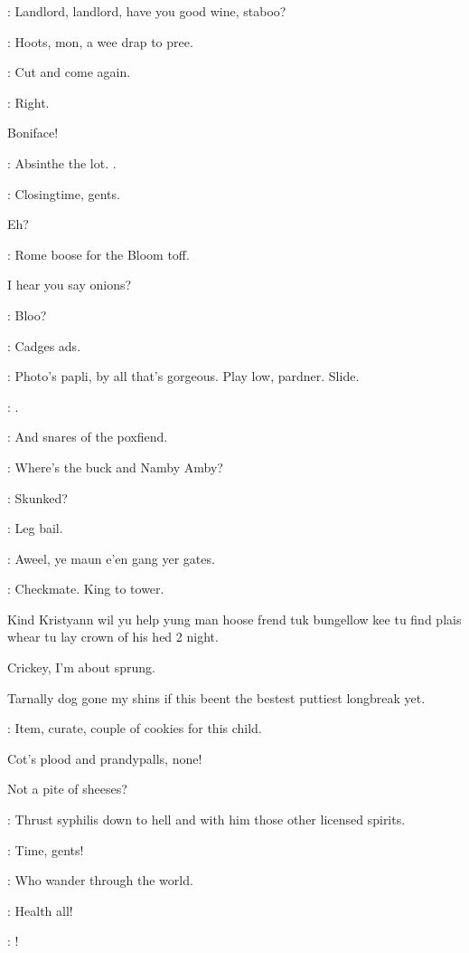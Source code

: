 \punch:
Landlord,
landlord,
have you good wine,
staboo?

\crotthers:
Hoots,
mon,
a wee drap to pree.

\lenehan:
Cut and come again.

\barman:
Right.

Boniface!

\stephen:
Absinthe the lot.
.

\barman:
Closingtime,
gents.

Eh?

\stephen:
Rome boose for the Bloom toff.

I hear you say onions?

\bannon:
Bloo?

\dixon:
Cadges ads.

\bannon:
Photo's papli,
by all that's gorgeous.
Play low,
pardner.
Slide.

\mulligan:
.


\stephen:
And snares of the poxfiend.

\bantam:
Where's the buck and Namby Amby?

\stephen:
Skunked?

\lenehan:
Leg bail.

\crotthers:
Aweel,
ye maun e'en gang yer gates.

\stephen:
Checkmate.
King to tower.

Kind Kristyann wil yu help yung man hoose frend
tuk bungellow kee tu find plais whear tu lay crown of his hed 2 night.

Crickey,
I'm about sprung.

Tarnally dog gone my shins if this beent the
bestest puttiest longbreak yet.

\punch:
Item,
curate,
couple of cookies for this child.

Cot's plood and prandypalls,
none!

Not a pite of sheeses?

\stephen:
Thrust syphilis down to hell and with him those other licensed spirits.

\barman:
Time,
gents!

\stephen:
Who wander through the world.

\punch:
Health all!

\dixon:
!

